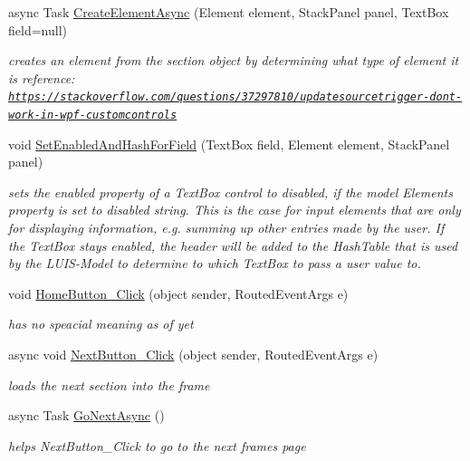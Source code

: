 \begin{DoxyCompactItemize}
async Task \mbox{\hyperlink{class_listen_to_me_1_1_main_page_a73b3a3311149846cf028c5824dab2a6e}{Create\+Element\+Async}} (Element element, Stack\+Panel panel, Text\+Box field=null)
\begin{DoxyCompactList}\small\item\em creates an element from the section object by determining what type of element it is reference\+: \href{https://stackoverflow.com/questions/37297810/updatesourcetrigger-dont-work-in-wpf-customcontrols}{\tt https\+://stackoverflow.\+com/questions/37297810/updatesourcetrigger-\/dont-\/work-\/in-\/wpf-\/customcontrols} \end{DoxyCompactList}\item 
void \mbox{\hyperlink{class_listen_to_me_1_1_main_page_a03c7cef2603da00588c9a6a87fde49b1}{Set\+Enabled\+And\+Hash\+For\+Field}} (Text\+Box field, Element element, Stack\+Panel panel)
\begin{DoxyCompactList}\small\item\em sets the enabled property of a Text\+Box control to disabled, if the model Element\textquotesingle{}s property is set to \textquotesingle{}disabled\textquotesingle{} string. This is the case for input elements that are only for displaying information, e.\+g. summing up other entries made by the user. If the Text\+Box stays enabled, the header will be added to the Hash\+Table that is used by the L\+U\+I\+S-\/\+Model to determine to which Text\+Box to pass a user value to. \end{DoxyCompactList}\item 
void \mbox{\hyperlink{class_listen_to_me_1_1_main_page_a20dbe0c5559b5b0d039d4eddedb8bb8f}{Home\+Button\+\_\+\+Click}} (object sender, Routed\+Event\+Args e)
\begin{DoxyCompactList}\small\item\em has no speacial meaning as of yet \end{DoxyCompactList}\item 
async void \mbox{\hyperlink{class_listen_to_me_1_1_main_page_a8144f2438fc2512708677190d74d2111}{Next\+Button\+\_\+\+Click}} (object sender, Routed\+Event\+Args e)
\begin{DoxyCompactList}\small\item\em loads the next section into the frame \end{DoxyCompactList}\item 
async Task \mbox{\hyperlink{class_listen_to_me_1_1_main_page_adb3a16ea6300f702c809a64ac87dc502}{Go\+Next\+Async}} ()
\begin{DoxyCompactList}\small\item\em helps Next\+Button\+\_\+\+Click to go to the next frame\textquotesingle{}s page \end{DoxyCompactList}\item 

\end{DoxyCompactItemize}
